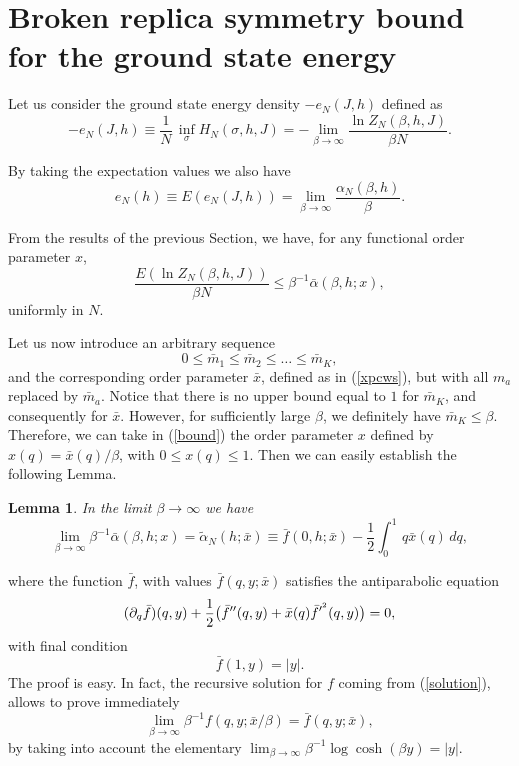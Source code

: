 \documentclass[a4paper,12pt]{article}
\newtheorem{lemma}{Lemma}
\begin{document}
\section{Broken replica symmetry bound for the ground state energy}

Let us consider the ground state energy density $-e_N(J,h)$ defined as
\begin{equation}
\label{eN}
-e_N(J,h)\equiv\frac1N\, \inf_{\sigma}H_N(\sigma,h,J)
\nonumber
= -\lim_{\beta \to \infty}\frac{\ln Z_N(\beta,h,J)}{\beta N}.
\end{equation}

By taking the expectation values we also have
\begin{equation}
\label{EeN}
e_N(h)\equiv E(e_N(J,h))=\lim_{\beta\to\infty}\frac{\alpha_N(\beta,h)}{\beta}.
\end{equation}

From the results of the previous Section, we have, for any functional order 
parameter $x$,
\begin{equation}
\label{bound}
\frac{E(\ln Z_N(\beta,h,J))}{\beta N}\le \beta^{-1} \bar\alpha(\beta,h;x),
\end{equation}
uniformly in $N$.

Let us now introduce an arbitrary sequence
\begin{equation}
\label{mbar}
0\le {\bar m}_1 \le {\bar m}_2 \le \dots 
\le {\bar m}_K,
\end{equation}
and the corresponding order parameter $\bar x$, defined as in (\ref{xpcws}), but 
with all $m_a$ replaced by ${\bar m}_a$. Notice that there is no upper 
bound equal to $1$ for 
${\bar m}_K$, and consequently for $\bar x$. However, for sufficiently 
large $\beta$, we definitely have ${\bar m}_K\le \beta$. Therefore, we can 
take in (\ref{bound}) the order parameter $x$ defined by $x(q)={\bar 
x}(q)/\beta$, with $0\le x(q)\le 1$. Then we can easily establish the 
following Lemma.
\begin{lemma}
\label{llim}
In the limit $\beta\to\infty$ we have
\begin{equation}
\lim_{\beta\to\infty} \beta^{-1} \bar\alpha(\beta,h;x)=\tilde\alpha_N(h;{\bar 
x})\equiv {\bar f}(0,h;{\bar x})-\frac12 \int^1_0\,q {\bar x}(q)\, dq,
\end{equation}
\end{lemma}
where the function $\bar f$, with values ${\bar f}(q,y;{\bar x})$ 
satisfies the antiparabolic equation
\begin{equation}
\label{antipara1}
(\partial_q {\bar f})(q,y)+
{1\over2}\bigl({\bar f}^{\prime\prime}(q,y)+
{\bar x}(q){\bar f}^{\prime^2}(q,y)\bigr)=0,
\end{equation}
with final condition
\begin{equation}
\label{final1}
{\bar f}(1,y)=|y|.
\end{equation}
The proof is easy. In fact, the recursive solution for $f$ coming from 
(\ref{solution}), allows to prove immediately
\begin{equation}
\nonumber
\lim_{\beta\to\infty} \beta^{-1} f(q,y;{\bar x}/\beta)={\bar f}(q,y;{\bar 
x}),
\end{equation}
by taking into account the elementary $\lim_{\beta\to\infty} \beta^{-1} 
\log\cosh(\beta y)=|y|$.
\end{document}
